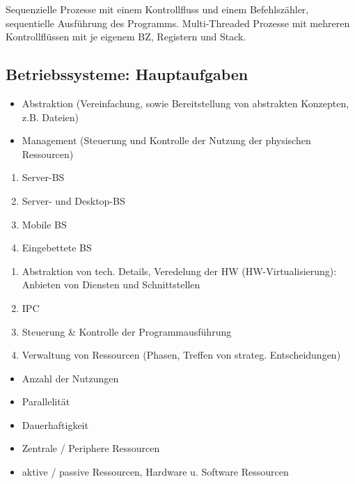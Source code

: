 Sequenzielle Prozesse mit einem Kontrollfluss und einem Befehlszähler, sequentielle Ausführung des Programms. Multi-Threaded Prozesse mit mehreren Kontrollflüssen mit je eigenem BZ, Registern und Stack. 

\subsection{Betriebssysteme: Hauptaufgaben}
\begin{itemize} \setlength\itemsep{0em}
	\item Abstraktion (Vereinfachung, sowie Bereitstellung von abstrakten Konzepten, z.B. Dateien)
	\item Management (Steuerung und Kontrolle der Nutzung der physischen Ressourcen)
\end{itemize}

\begin{enumerate} \setlength\itemsep{0em}
	\item Server-BS
	\item Server- und Desktop-BS
	\item Mobile BS
	\item Eingebettete BS
\end{enumerate}

\begin{enumerate} \setlength\itemsep{0em}
	\item Abstraktion von tech. Details, Veredelung der HW (HW-Virtualisierung): Anbieten von Diensten und Schnittstellen
	\item IPC
	\item Steuerung \& Kontrolle der Programmausführung
	\item Verwaltung von Ressourcen (Phasen, Treffen von strateg. Entscheidungen)
\end{enumerate}

\begin{itemize} \setlength\itemsep{0em}
	\item Anzahl der Nutzungen
	\item Parallelität
	\item Dauerhaftigkeit 
	\item Zentrale / Periphere Ressourcen
	\item aktive / passive Ressourcen, Hardware u. Software Ressourcen 
\end{itemize}

